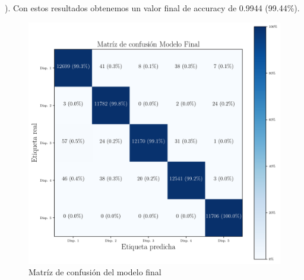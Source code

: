 ). Con estos resultados obtenemos un valor final de accuracy de 0.9944 (99.44\%).

\begin{figure}[H]
    \centering
    \includegraphics[scale=0.3]{../Python/plots/parallel/final_model_matrix}
    \caption{Matríz de confusión del modelo final}
    \label{fig:final_matrix}
\end{figure}

